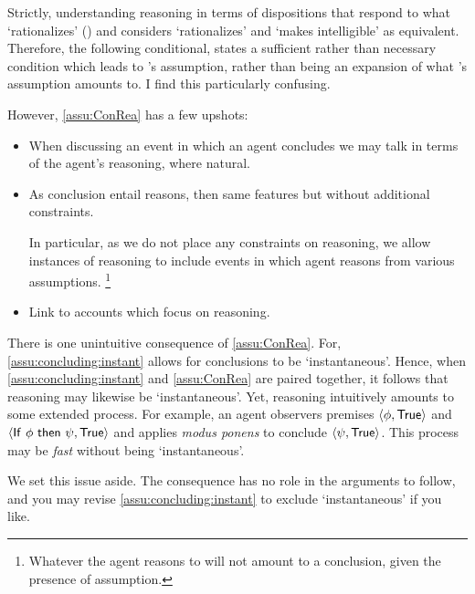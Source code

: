 \begin{note}
{  Strictly, \citeauthor{Wedgwood:2006ui} understanding reasoning in terms of dispositions that respond to what `rationalizes' (\citeyear[672]{Wedgwood:2006ui}) and \citeauthor{Wedgwood:2006ui} considers `rationalizes' and  `makes intelligible' as equivalent.
    Therefore, the following conditional, states a sufficient rather than necessary condition which leads to \citeauthor{Wedgwood:2006ui}'s assumption, rather than being an expansion of what \citeauthor{Wedgwood:2006ui}'s assumption amounts to.
    I find this particularly confusing.
  }

  However, \autoref{assu:ConRea} has a few upshots:

  \begin{itemize}
  \item
    When discussing an event in which an agent concludes we may talk in terms of the agent's reasoning, where natural.
  \item
    As conclusion entail reasons, then same features but without additional constraints.

    In particular, as we do not place any constraints on reasoning, we allow instances of reasoning to include events in which agent reasons from various assumptions.%
    \footnote{
      Whatever the agent reasons to will not amount to a conclusion, given the presence of assumption.
    }
  \item
    Link to accounts which focus on reasoning.
  \end{itemize}
\end{note}

\begin{note}
  There is one unintuitive consequence of \autoref{assu:ConRea}.
  For, \autoref{assu:concluding:instant} allows for conclusions to be `instantaneous'.
  Hence, when \autoref{assu:concluding:instant} and \autoref{assu:ConRea} are paired together, it follows that reasoning may likewise be `instantaneous'.
  Yet, reasoning intuitively amounts to some extended process.
  For example, an agent observers premises \(\langle \phi, \text{\textsf{True}} \rangle\) and \(\pv{\prop{If }\phi\prop{ then }\psi}{\val{True}}\) and applies \emph{modus ponens} to conclude \(\langle \psi, \text{\textsf{True}} \rangle\).
  This process may be \emph{fast} without being `instantaneous'.

  We set this issue aside.
  The consequence has no role in the arguments to follow, and you may revise \autoref{assu:concluding:instant} to exclude `instantaneous' if you like.
\end{note}

